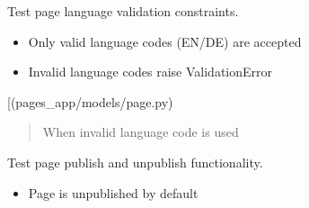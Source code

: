 \documentclass[letterpaper,10pt,english]{sphinxmanual}
\begin{document}
\begin{fulllineitems}
\begin{fulllineitems}
\begin{description}
\begin{itemize}
\end{itemize}

\end{description}

\end{fulllineitems}


\begin{fulllineitems}
\label{\detokenize{pages_app.tests:pages_app.tests.test_models.PageModelTest.test_page_language_validation}}
\pysigstartsignatures
\pysiglinewithargsret
{}
{}
{}
\pysigstopsignatures
\sphinxAtStartPar
Test page language validation constraints.
\begin{description}
\begin{itemize}
\item {} 
\sphinxAtStartPar
Only valid language codes (EN/DE) are accepted

\item {} 
\sphinxAtStartPar
Invalid language codes raise ValidationError

\end{itemize}

\sphinxAtStartPar
{[}\sphinxtitleref{Page}{]}(pages\_app/models/page.py)

\end{description}
\begin{quote}\begin{description}
\sphinxAtStartPar
{} \textendash{} When invalid language code is used

\end{description}\end{quote}

\end{fulllineitems}


\begin{fulllineitems}
\label{\detokenize{pages_app.tests:pages_app.tests.test_models.PageModelTest.test_page_publish_unpublish}}
\pysigstartsignatures
\pysiglinewithargsret
{}
{}
{}
\pysigstopsignatures
\sphinxAtStartPar
Test page publish and unpublish functionality.
\begin{description}
\begin{itemize}
\item {} 
\sphinxAtStartPar
Page is unpublished by default


\end{itemize}
\end{description}
\end{fulllineitems}
\end{fulllineitems}
\end{document}
